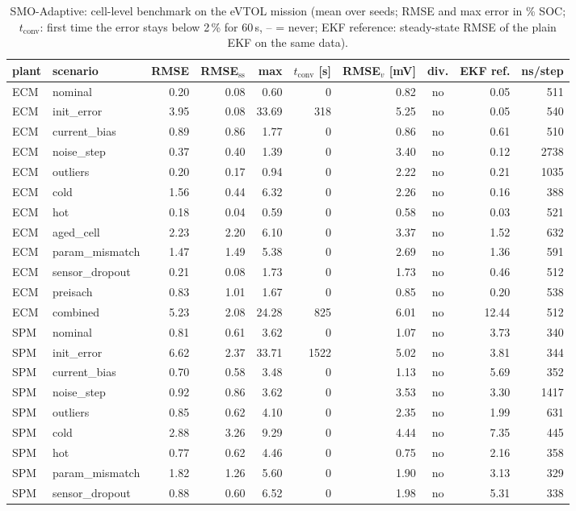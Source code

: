 \begin{table}[H]\centering\footnotesize\setlength{\tabcolsep}{4pt}
\caption{SMO-Adaptive: cell-level benchmark on the eVTOL mission (mean over seeds; RMSE and max error in \% SOC; $t_\mathrm{conv}$: first time the error stays below 2\,\% for 60\,s, -- = never; EKF reference: steady-state RMSE of the plain EKF on the same data).}\label{tab:cell_SMOAdaptive}
\begin{tabular}{llrrrrrcrr}\toprule
plant & scenario & RMSE & RMSE$_\mathrm{ss}$ & max & $t_\mathrm{conv}$ [s] & RMSE$_v$ [mV] & div. & EKF ref. & ns/step \\ \midrule
ECM & nominal & 0.20 & 0.08 & 0.60 & 0 & 0.82 & no & 0.05 & 511 \\
ECM & init\_error & 3.95 & 0.08 & 33.69 & 318 & 5.25 & no & 0.05 & 540 \\
ECM & current\_bias & 0.89 & 0.86 & 1.77 & 0 & 0.86 & no & 0.61 & 510 \\
ECM & noise\_step & 0.37 & 0.40 & 1.39 & 0 & 3.40 & no & 0.12 & 2738 \\
ECM & outliers & 0.20 & 0.17 & 0.94 & 0 & 2.22 & no & 0.21 & 1035 \\
ECM & cold & 1.56 & 0.44 & 6.32 & 0 & 2.26 & no & 0.16 & 388 \\
ECM & hot & 0.18 & 0.04 & 0.59 & 0 & 0.58 & no & 0.03 & 521 \\
ECM & aged\_cell & 2.23 & 2.20 & 6.10 & 0 & 3.37 & no & 1.52 & 632 \\
ECM & param\_mismatch & 1.47 & 1.49 & 5.38 & 0 & 2.69 & no & 1.36 & 591 \\
ECM & sensor\_dropout & 0.21 & 0.08 & 1.73 & 0 & 1.73 & no & 0.46 & 512 \\
ECM & preisach & 0.83 & 1.01 & 1.67 & 0 & 0.85 & no & 0.20 & 538 \\
ECM & combined & 5.23 & 2.08 & 24.28 & 825 & 6.01 & no & 12.44 & 512 \\
\midrule
SPM & nominal & 0.81 & 0.61 & 3.62 & 0 & 1.07 & no & 3.73 & 340 \\
SPM & init\_error & 6.62 & 2.37 & 33.71 & 1522 & 5.02 & no & 3.81 & 344 \\
SPM & current\_bias & 0.70 & 0.58 & 3.48 & 0 & 1.13 & no & 5.69 & 352 \\
SPM & noise\_step & 0.92 & 0.86 & 3.62 & 0 & 3.53 & no & 3.30 & 1417 \\
SPM & outliers & 0.85 & 0.62 & 4.10 & 0 & 2.35 & no & 1.99 & 631 \\
SPM & cold & 2.88 & 3.26 & 9.29 & 0 & 4.44 & no & 7.35 & 445 \\
SPM & hot & 0.77 & 0.62 & 4.46 & 0 & 0.75 & no & 2.16 & 358 \\
SPM & param\_mismatch & 1.82 & 1.26 & 5.60 & 0 & 1.90 & no & 3.13 & 329 \\
SPM & sensor\_dropout & 0.88 & 0.60 & 6.52 & 0 & 1.98 & no & 5.31 & 338 \\
\bottomrule\end{tabular}\end{table}
